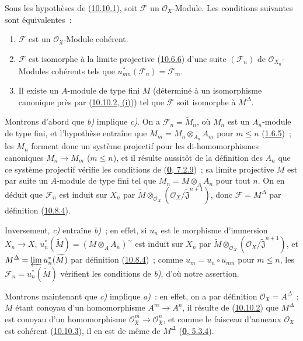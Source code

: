 \begin{proposition}[10.10.5]
\label{I.10.10.5-fr}
Sous les hypothèses de \textup{(\hyperref[I.10.10.1-fr]{10.10.1})}, soit
$\mathscr{F}$ un $\mathscr{O}_{\mathfrak{X}}$-Module. Les conditions
suivantes sont équivalentes~:
\begin{enumerate}
  \item[\textup{a)}] $\mathscr{F}$ est un $\mathscr{O}_{\mathfrak{X}}$-Module
    cohérent.
  \item[\textup{b)}] $\mathscr{F}$ est isomorphe à la limite projective
    \textup{(\hyperref[I.10.6.6-fr]{10.6.6})} d'une suite $(\mathscr{F}_n)$ de
    $\mathscr{O}_{X_n}$-Modules cohérents tels que
    $u_{mn}^*(\mathscr{F}_n)=\mathscr{F}_m$.
  \item[\textup{c)}] Il existe un $A$-module de type fini $M$ (déterminé à un
    isomorphisme canonique près par
    \textup{(\hyperref[I.10.10.2-fr]{10.10.2, (i)})}) tel que $\mathscr{F}$ soit
    isomorphe à $M^\Delta$.
\end{enumerate}
\end{proposition}

Montrons d'abord que \emph{b)} implique \emph{c)}. On a
$\mathscr{F}_n=\widetilde{M}_n$, où $M_n$ est un $A_n$-module de type
fini, et l'hypothèse entraîne que
$M_m=M_n\otimes_{A_n}A_m$ pour $m\leq n$
(\hyperref[I.1.6.5-fr]{1.6.5})~; les $M_n$ forment donc un système
projectif pour les di-homomorphismes canoniques $M_n\to M_m$
($m\leq n$), et il résulte aussitôt de la définition des $A_n$ que ce
système projectif vérifie les conditions de
(\hyperref[0.7.2.9-fr]{\textbf{0}, 7.2.9})~; sa limite projective $M$ est par
suite un $A$-module de type fini tel que
$M_n=M\otimes_A A_n$ pour tout $n$. On en déduit que $\mathscr{F}_n$
est induit sur $X_n$ par
$\widetilde M\otimes_{\mathscr{O}_X}
(\mathscr{O}_X/\widetilde{\mathfrak{J}}^{n+1})$, donc
$\mathscr{F}=M^\Delta$ par définition
(\hyperref[I.10.8.4-fr]{10.8.4}).

Inversement, \emph{c)} entraîne \emph{b)}~; en effet, si $u_n$ est le morphisme
d'immersion $X_n\to X$,
$u_n^*(\widetilde M)=(M\otimes_A A_n)^{\sim}$ est induit sur $X_n$ par
$\widetilde M\otimes_{\mathscr{O}_X}
(\mathscr{O}_X/\widetilde{\mathfrak{J}}^{n+1})$, et
$M^\Delta=\varprojlim u_n^*(\widetilde M)$ par définition
(\hyperref[I.10.8.4-fr]{10.8.4})~; comme
$u_m=u_n\circ u_{mn}$ pour $m\leq n$, les
$\mathscr{F}_n=u_n^*(\widetilde M)$ vérifient les conditions de \emph{b)},
d'où notre assertion.

Montrons maintenant que \emph{c)} implique \emph{a)}~: en effet, on a par définition
$\mathscr{O}_{\mathfrak{X}}=A^\Delta$~; $M$ étant conoyau d'un
homomorphisme $A^m\to A^n$, il résulte de
(\hyperref[I.10.10.2-fr]{10.10.2}) que $M^\Delta$ est conoyau d'un
homomorphisme
$\mathscr{O}_{\mathfrak{X}}^m\to\mathscr{O}_{\mathfrak{X}}^n$, et
comme le faisceau d'anneaux $\mathscr{O}_{\mathfrak{X}}$ est cohérent
(\hyperref[I.10.10.3-fr]{10.10.3}), il en est de même de $M^\Delta$
(\hyperref[0.5.3.4-fr]{\textbf{0}, 5.3.4}).

